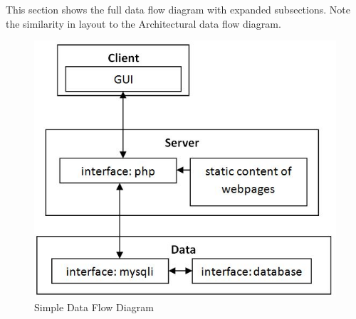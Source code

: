 This section shows the full data flow diagram with expanded subsections. Note the similarity in layout to the Architectural data flow diagram.

\begin{figure}[h!]
	\centering
 	\includegraphics[width=1.0\textwidth]{images/LayerBlockDiagramWithSubsystems}
 \caption{Simple Data Flow Diagram}
\end{figure}
